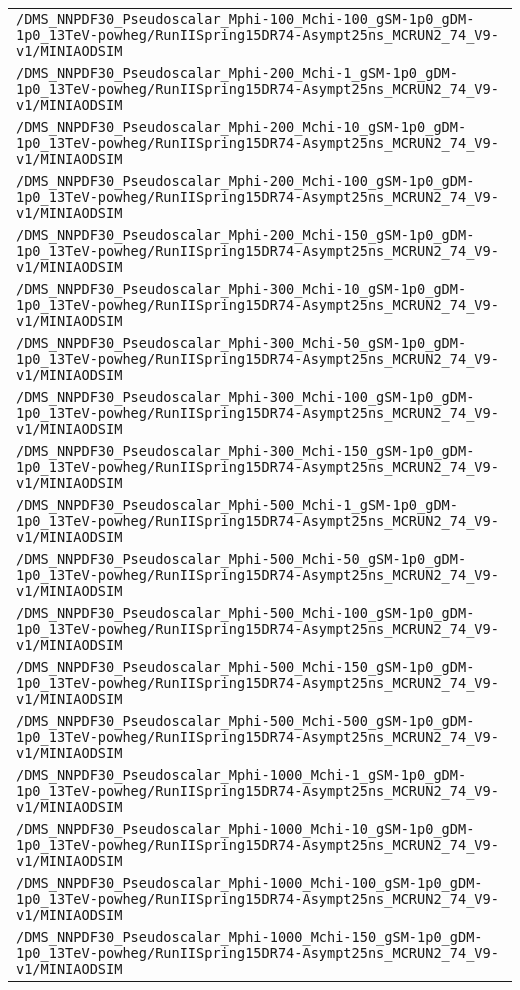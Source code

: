 \begin{center}
\begin{tabular}{l}
\verb!/DMS_NNPDF30_Pseudoscalar_Mphi-100_Mchi-100_gSM-1p0_gDM-1p0_13TeV-powheg/RunIISpring15DR74-Asympt25ns_MCRUN2_74_V9-v1/MINIAODSIM! \tabularnewline
\verb!/DMS_NNPDF30_Pseudoscalar_Mphi-200_Mchi-1_gSM-1p0_gDM-1p0_13TeV-powheg/RunIISpring15DR74-Asympt25ns_MCRUN2_74_V9-v1/MINIAODSIM! \tabularnewline
\verb!/DMS_NNPDF30_Pseudoscalar_Mphi-200_Mchi-10_gSM-1p0_gDM-1p0_13TeV-powheg/RunIISpring15DR74-Asympt25ns_MCRUN2_74_V9-v1/MINIAODSIM! \tabularnewline
\verb!/DMS_NNPDF30_Pseudoscalar_Mphi-200_Mchi-100_gSM-1p0_gDM-1p0_13TeV-powheg/RunIISpring15DR74-Asympt25ns_MCRUN2_74_V9-v1/MINIAODSIM! \tabularnewline
\verb!/DMS_NNPDF30_Pseudoscalar_Mphi-200_Mchi-150_gSM-1p0_gDM-1p0_13TeV-powheg/RunIISpring15DR74-Asympt25ns_MCRUN2_74_V9-v1/MINIAODSIM! \tabularnewline
\verb!/DMS_NNPDF30_Pseudoscalar_Mphi-300_Mchi-10_gSM-1p0_gDM-1p0_13TeV-powheg/RunIISpring15DR74-Asympt25ns_MCRUN2_74_V9-v1/MINIAODSIM! \tabularnewline
\verb!/DMS_NNPDF30_Pseudoscalar_Mphi-300_Mchi-50_gSM-1p0_gDM-1p0_13TeV-powheg/RunIISpring15DR74-Asympt25ns_MCRUN2_74_V9-v1/MINIAODSIM! \tabularnewline
\verb!/DMS_NNPDF30_Pseudoscalar_Mphi-300_Mchi-100_gSM-1p0_gDM-1p0_13TeV-powheg/RunIISpring15DR74-Asympt25ns_MCRUN2_74_V9-v1/MINIAODSIM! \tabularnewline
\verb!/DMS_NNPDF30_Pseudoscalar_Mphi-300_Mchi-150_gSM-1p0_gDM-1p0_13TeV-powheg/RunIISpring15DR74-Asympt25ns_MCRUN2_74_V9-v1/MINIAODSIM! \tabularnewline
\verb!/DMS_NNPDF30_Pseudoscalar_Mphi-500_Mchi-1_gSM-1p0_gDM-1p0_13TeV-powheg/RunIISpring15DR74-Asympt25ns_MCRUN2_74_V9-v1/MINIAODSIM! \tabularnewline
\verb!/DMS_NNPDF30_Pseudoscalar_Mphi-500_Mchi-50_gSM-1p0_gDM-1p0_13TeV-powheg/RunIISpring15DR74-Asympt25ns_MCRUN2_74_V9-v1/MINIAODSIM! \tabularnewline
\verb!/DMS_NNPDF30_Pseudoscalar_Mphi-500_Mchi-100_gSM-1p0_gDM-1p0_13TeV-powheg/RunIISpring15DR74-Asympt25ns_MCRUN2_74_V9-v1/MINIAODSIM! \tabularnewline
\verb!/DMS_NNPDF30_Pseudoscalar_Mphi-500_Mchi-150_gSM-1p0_gDM-1p0_13TeV-powheg/RunIISpring15DR74-Asympt25ns_MCRUN2_74_V9-v1/MINIAODSIM! \tabularnewline
\verb!/DMS_NNPDF30_Pseudoscalar_Mphi-500_Mchi-500_gSM-1p0_gDM-1p0_13TeV-powheg/RunIISpring15DR74-Asympt25ns_MCRUN2_74_V9-v1/MINIAODSIM! \tabularnewline
\verb!/DMS_NNPDF30_Pseudoscalar_Mphi-1000_Mchi-1_gSM-1p0_gDM-1p0_13TeV-powheg/RunIISpring15DR74-Asympt25ns_MCRUN2_74_V9-v1/MINIAODSIM! \tabularnewline
\verb!/DMS_NNPDF30_Pseudoscalar_Mphi-1000_Mchi-10_gSM-1p0_gDM-1p0_13TeV-powheg/RunIISpring15DR74-Asympt25ns_MCRUN2_74_V9-v1/MINIAODSIM! \tabularnewline
\verb!/DMS_NNPDF30_Pseudoscalar_Mphi-1000_Mchi-100_gSM-1p0_gDM-1p0_13TeV-powheg/RunIISpring15DR74-Asympt25ns_MCRUN2_74_V9-v1/MINIAODSIM! \tabularnewline
\verb!/DMS_NNPDF30_Pseudoscalar_Mphi-1000_Mchi-150_gSM-1p0_gDM-1p0_13TeV-powheg/RunIISpring15DR74-Asympt25ns_MCRUN2_74_V9-v1/MINIAODSIM! \tabularnewline

\end{tabular}
\end{center}
